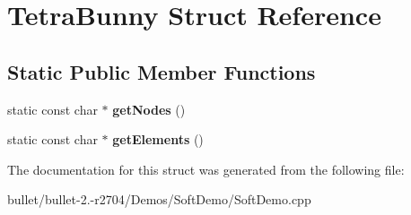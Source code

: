 \hypertarget{struct_tetra_bunny}{\section{Tetra\+Bunny Struct Reference}
\label{struct_tetra_bunny}
}
\subsection*{Static Public Member Functions}
\begin{DoxyCompactItemize}
\item 
\hypertarget{struct_tetra_bunny_aae6586b040cc96e556466522f04cfc7a}{static const char $\ast$ {\bfseries get\+Nodes} ()}\label{struct_tetra_bunny_aae6586b040cc96e556466522f04cfc7a}

\item 
\hypertarget{struct_tetra_bunny_a411a1f8ae8b1611bd1d85cc6e47989dd}{static const char $\ast$ {\bfseries get\+Elements} ()}\label{struct_tetra_bunny_a411a1f8ae8b1611bd1d85cc6e47989dd}

\end{DoxyCompactItemize}


The documentation for this struct was generated from the following file\+:\begin{DoxyCompactItemize}
\item 
bullet/bullet-\/2.-\/r2704/\+Demos/\+Soft\+Demo/Soft\+Demo.\+cpp\end{DoxyCompactItemize}
